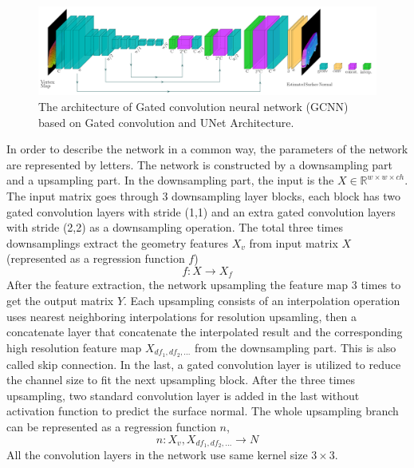 \begin{figure}
	\centering
	\includegraphics[width=1\textwidth]{Figures/gcnn}
	\caption{The architecture of Gated convolution neural network (GCNN) based on Gated convolution and UNet Architecture.}
	\label{fig:gcnn-archi}
\end{figure}
In order to describe the network in a common way, the parameters of the network are represented by letters.
The network is constructed by a downsampling part and a upsampling part. In the downsampling part, the input is the $ X \in \mathbb{R}^{w\times w\times ch}$. The input matrix goes through 3 downsampling layer blocks, each block has two gated convolution layers with stride (1,1) and an extra gated convolution layers with stride (2,2) as a downsampling operation. 
The total three times downsamplings extract the geometry features $ X_v $ from input matrix $ X $ (represented as a regression function $ f $)
\[ f: X \rightarrow X_f \]
After the feature extraction, the network upsampling the feature map 3 times to get the output matrix $ Y $. Each upsampling consists of an interpolation operation uses nearest neighboring interpolations for resolution upsamling, then a concatenate layer that concatenate the interpolated result and the corresponding high resolution feature map  $ X_{df_1, df_2, ...} $  from the downsampling part. This is also called skip connection. In the last, a gated convolution layer is utilized to reduce the channel size to fit the next upsampling block. After the three times upsampling, two standard convolution layer is added in the last without activation function to predict the surface normal. The whole upsampling branch can be represented as a regression function $ n $,
\[ n: X_v, X_{df_1, df_2, ...} \rightarrow N \]
All the convolution layers in the network use same kernel size $ 3\times 3 $. 


